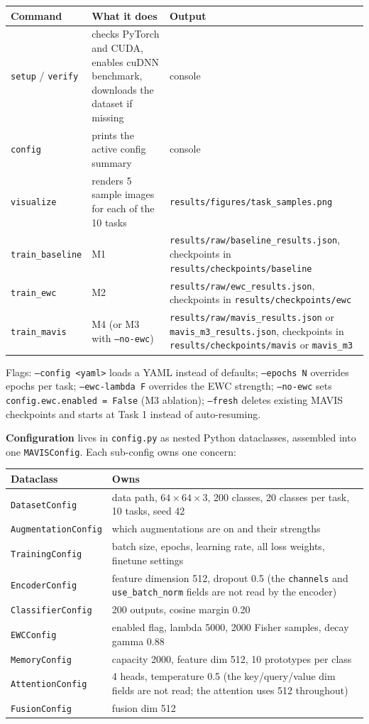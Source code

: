 \documentclass[11pt,a4paper]{article}
\newcommand{\code}[1]{\texttt{#1}}
\begin{document}
\begin{tabularx}{\textwidth}{L{3cm} Y L{5.2cm}}
\toprule
Command & What it does & Output \\
\midrule
\code{setup} / \code{verify} & checks PyTorch and CUDA, enables cuDNN benchmark, downloads the dataset if missing & console \\
\code{config} & prints the active config summary & console \\
\code{visualize} & renders 5 sample images for each of the 10 tasks & \code{results/figures/task\_samples.png} \\
\code{train\_baseline} & M1 & \code{results/raw/baseline\_results.json}, checkpoints in \code{results/checkpoints/baseline} \\
\code{train\_ewc} & M2 & \code{results/raw/ewc\_results.json}, checkpoints in \code{results/checkpoints/ewc} \\
\code{train\_mavis} & M4 (or M3 with \code{--no-ewc}) & \code{results/raw/mavis\_results.json} or \code{mavis\_m3\_results.json}, checkpoints in \code{results/checkpoints/mavis} or \code{mavis\_m3} \\
\bottomrule
\end{tabularx}

Flags: \code{--config <yaml>} loads a YAML instead of defaults; \code{--epochs N} overrides epochs per task; \code{--ewc-lambda F} overrides the EWC strength; \code{--no-ewc} sets \code{config.ewc.enabled = False} (M3 ablation); \code{--fresh} deletes existing MAVIS checkpoints and starts at Task 1 instead of auto-resuming.

\textbf{Configuration} lives in \code{config.py} as nested Python dataclasses, assembled into one \code{MAVISConfig}. Each sub-config owns one concern:

\begin{tabularx}{\textwidth}{L{3.6cm} Y}
\toprule
Dataclass & Owns \\
\midrule
\code{DatasetConfig} & data path, $64 \times 64 \times 3$, 200 classes, 20 classes per task, 10 tasks, seed 42 \\
\code{AugmentationConfig} & which augmentations are on and their strengths \\
\code{TrainingConfig} & batch size, epochs, learning rate, all loss weights, finetune settings \\
\code{EncoderConfig} & feature dimension 512, dropout 0.5 (the \code{channels} and \code{use\_batch\_norm} fields are not read by the encoder) \\
\code{ClassifierConfig} & 200 outputs, cosine margin 0.20 \\
\code{EWCConfig} & enabled flag, lambda 5000, 2000 Fisher samples, decay gamma 0.88 \\
\code{MemoryConfig} & capacity 2000, feature dim 512, 10 prototypes per class \\
\code{AttentionConfig} & 4 heads, temperature 0.5 (the key/query/value dim fields are not read; the attention uses 512 throughout) \\
\code{FusionConfig} & fusion dim 512 \\
\bottomrule
\end{tabularx}
\end{document}
